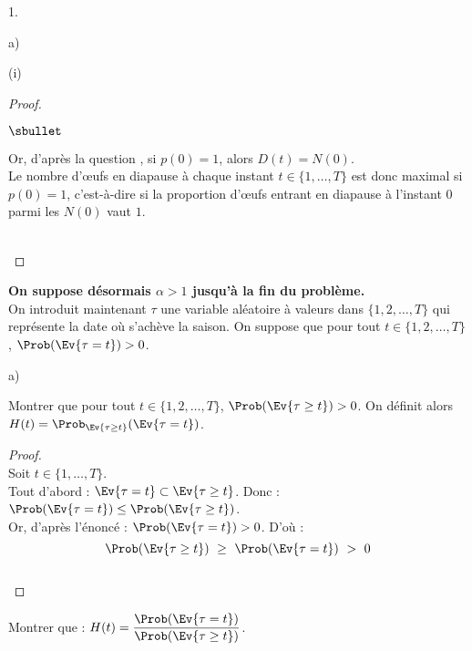 \begin{noliste}{1.}
\begin{noliste}{a)}
\begin{nonoliste}{(i)}
\begin{proof}
\begin{noliste}{$\sbullet$}
	  \item Or, d'après la question , si $p(0)=1$, 
	  alors $D(t)=N(0)$.\\
	  Le nombre d'{\oe}ufs en diapause à chaque instant $t\in \{1, 
	  \ldots, T\}$ est donc maximal si $p(0)=1$, c'est-à-dire si la 
	  proportion d'{\oe}ufs entrant en diapause à l'instant $0$
	  parmi les $N(0)$ vaut $1$.
        \end{noliste}
        ~\\[-1cm]
      \end{proof}

    \end{nonoliste}
  \end{noliste}
  
  \item {\bf On suppose désormais $\alpha >1$ jusqu'à la fin du 
  problème.}\\
  On introduit maintenant $\tau$ une variable aléatoire à valeurs dans 
  $\{1,2, \ldots, T\}$ qui représente la date où s'achève la saison. On 
  suppose que pour tout $t \in \{1,2, \ldots, T\}$, $\Prob(
  \Ev{\tau=t}) >0$.
  \begin{noliste}{a)}
    \setlength{\itemsep}{2mm}
    \item Montrer que pour tout $t\in \{1,2, \ldots, T\}$, $\Prob(
    \Ev{\tau \geq t}) >0$. On définit alors $H(t)= \Prob_{\Ev{\tau \geq 
    t}}(\Ev{\tau =t})$.
    
    \begin{proof}~\\
      Soit $t\in \{1, \ldots, T\}$.\\
      Tout d'abord : $\Ev{\tau =t} \subset \Ev{\tau \geq t}$.
      Donc : $\Prob(\Ev{\tau = t}) \leq \Prob(\Ev{\tau \geq t})$.\\
      Or, d'après l'énoncé : $\Prob(\Ev{\tau =t}) >0$. D'où :
      \[
        \Prob(\Ev{\tau \geq t}) \ \geq \ \Prob(\Ev{\tau =t}) \ > \ 0
      \]
      ~\\[-1cm]
    \end{proof}

    
    \item Montrer que : $H(t)= \dfrac{\Prob(\Ev{\tau=t})}{\Prob(\Ev{\tau
    \geq t})}$.
    

\end{noliste}
\end{noliste}

